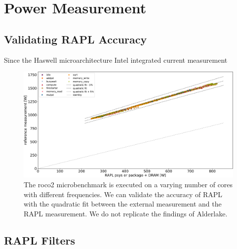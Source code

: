 \chapter{Power Measurement}

\section{Validating RAPL Accuracy}
Since the Haswell microarchitecture Intel integrated current measurement 


\begin{figure}[]
    \centering
    \includegraphics[width=\columnwidth]{fig/rapl-validation.pdf}
    \caption{\label{fig:validate-rapl}The roco2 microbenchmark is executed on a varying number of cores with different frequencies.
    We can validate the accuracy of RAPL with the quadratic fit between the external measurement and the RAPL measurement.
    We do not replicate the findings of Alderlake.}
\end{figure}

\section{RAPL Filters}

